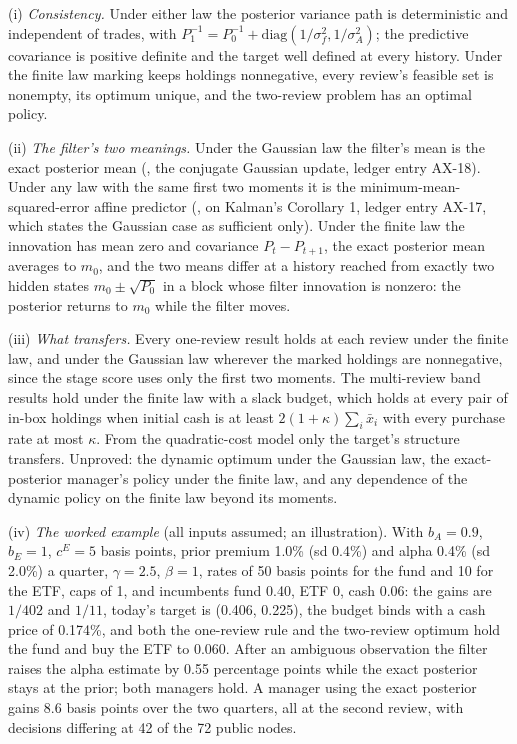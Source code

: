 \documentclass[11pt]{article}
\begin{document}
(i) \emph{Consistency.} Under either law the posterior variance path is
deterministic and independent of trades, with
\(P_1^{-1}=P_0^{-1}+\mathrm{diag}(1/\sigma_f^2,1/\sigma_A^2)\); the predictive covariance is positive
definite and the target well defined at every history. Under the finite
law marking keeps holdings nonnegative, every review's feasible set is
nonempty, its optimum unique, and the two-review problem has an optimal
policy.

(ii) \emph{The filter's two meanings.} Under the Gaussian law the filter's
mean is the exact posterior mean (\cite{murphy2007conjugate}, the conjugate
Gaussian update, ledger entry AX-18). Under any law with the same first
two moments it is the minimum-mean-squared-error affine predictor
(\cite{uhlmann2022gaussianity}, on Kalman's Corollary 1, ledger entry AX-17,
which states the Gaussian case as sufficient only). Under the finite
law the innovation has mean zero and covariance \(P_t-P_{t+1}\), the exact
posterior mean averages to \(m_0\), and the two means differ at a history
reached from exactly two hidden states \(m_0\pm\sqrt{P_0}\) in a block whose
filter innovation is nonzero: the posterior returns to \(m_0\) while the
filter moves.

(iii) \emph{What transfers.} Every one-review result holds at each review
under the finite law, and under the Gaussian law wherever the marked
holdings are nonnegative, since the stage score uses only the first two
moments. The multi-review band results hold under the finite law with a
slack budget, which holds at every pair of in-box holdings when initial
cash is at least \(2(1+\kappa)\sum_i\bar x_i\) with every purchase rate at most \(\kappa\).
From the quadratic-cost model only the target's structure transfers.
Unproved: the dynamic optimum under the Gaussian law, the exact-posterior
manager's policy under the finite law, and any dependence of the dynamic
policy on the finite law beyond its moments.

(iv) \emph{The worked example} (all inputs assumed; an illustration). With
\(b_A=0.9\), \(b_E=1\), \(c^E=5\) basis points, prior premium 1.0\% (sd 0.4\%) and alpha
0.4\% (sd 2.0\%) a quarter, \(\gamma=2.5\), \(\beta=1\), rates of 50 basis points for the fund
and 10 for the ETF, caps of 1, and incumbents fund 0.40, ETF 0, cash
0.06: the gains are \(1/402\) and \(1/11\), today's target is (0.406, 0.225),
the budget binds with a cash price of 0.174\%, and both the one-review
rule and the two-review optimum hold the fund and buy the ETF to 0.060.
After an ambiguous observation the filter raises the alpha estimate by
0.55 percentage points while the exact posterior stays at the prior;
both managers hold. A manager using the exact posterior gains 8.6 basis
points over the two quarters, all at the second review, with decisions
differing at 42 of the 72 public nodes.
\end{document}
